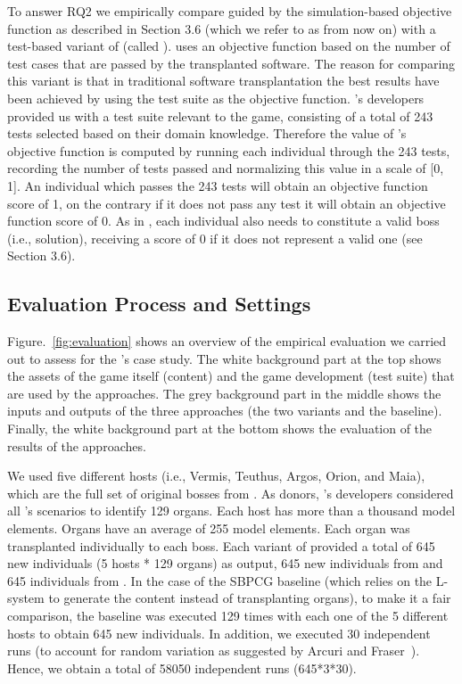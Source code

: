 To answer RQ2 we empirically compare \ApproachName{} guided by the simulation-based objective function as described in Section 3.6 (which we refer to as \simhotep{} from now on) with  a test-based variant of \ApproachName{} (called \timhotep{}). \timhotep{} uses an objective function based on the number of test cases that are passed by the transplanted software. 
The reason for comparing this variant is that in traditional software transplantation the best results have been achieved by using the test suite as the objective function. 
\CaseStudy{}'s developers provided us with a test suite relevant to the game, consisting of a total of 243 tests selected based on their domain knowledge. 
Therefore the value of \timhotep{}'s objective function is computed by running each individual through the 243 tests, recording the number of tests passed and normalizing this value in a scale of [0, 1]. An individual which passes the 243 tests will obtain an objective function score of 1, on the contrary if it does not pass any test it will obtain an objective function score of 0.  
As in \simhotep{},  each individual also needs to constitute a valid boss (i.e., solution), receiving a score of 0 if it does not represent a valid one (see Section 3.6).

\subsection{Evaluation Process and Settings}
Figure.~\ref{fig:evaluation} shows an overview of the empirical evaluation we carried out to assess \ApproachName{} for the \CaseStudy's case study. The white background part at the top shows the assets of the game itself (content) and the game development (test suite) that are used by the approaches. The grey background part in the middle shows the inputs and outputs of the three approaches (the two \ApproachName{} variants and the baseline). Finally, the white background part at the bottom shows the evaluation of the results of the approaches.

We used five different hosts (i.e., Vermis, Teuthus, Argos, Orion, and Maia), which are the full set of original bosses from \CaseStudy{}. As donors, \CaseStudy{}'s developers considered all \CaseStudy{}'s scenarios to identify 129 organs. Each host has more than a thousand model elements. Organs have an average of 255 model elements. Each organ was transplanted individually to each boss. Each variant of \ApproachName{} provided a total of 645 new individuals (5 hosts * 129 organs) as output, 645 new individuals from \simhotep{} and 645 individuals from \timhotep{}. In the case of the SBPCG baseline (which relies on the L-system to generate the content instead of transplanting organs), to make it a fair comparison, the baseline was executed 129 times with each one of the 5 different hosts to obtain 645 new individuals. In addition, we executed 30 independent runs (to account for random variation as suggested by Arcuri and Fraser~\cite{arcuri2013parameter}). Hence, we obtain a total of 58050 independent runs (645*3*30).


